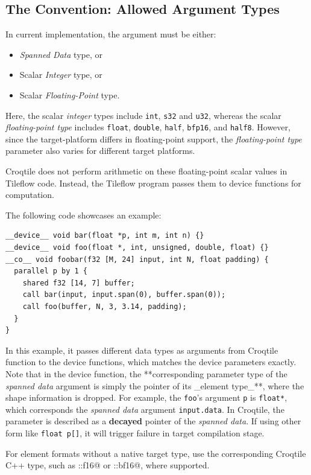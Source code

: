 \subsection*{The Convention: Allowed Argument Types}

In current implementation, the argument must be either:

\begin{itemize}[leftmargin=1.6em]
\item \emph{Spanned Data} type, or
\item Scalar \emph{Integer} type, or
\item Scalar \emph{Floating-Point} type.
\end{itemize}

Here, the scalar \emph{integer} types include \texttt{int}, \texttt{s32} and \texttt{u32}, whereas the scalar \emph{floating-point type} includes \texttt{float}, \texttt{double}, \texttt{half}, \texttt{bfp16}, and \texttt{half8}. However, since the target-platform differs in floating-point support, the \emph{floating-point type} parameter also varies for different target platforms.

Croqtile does not perform arithmetic on these floating-point scalar values in Tileflow code. Instead, the Tileflow program passes them to device functions for computation.

The following code showcases an example:

\begin{lstlisting}[language=croqtile,caption={The Convention: Allowed Argument Types}]
__device__ void bar(float *p, int m, int n) {}
__device__ void foo(float *, int, unsigned, double, float) {}
__co__ void foobar(f32 [M, 24] input, int N, float padding) {
  parallel p by 1 {
    shared f32 [14, 7] buffer;
    call bar(input, input.span(0), buffer.span(0));
    call foo(buffer, N, 3, 3.14, padding);
  }
}
\end{lstlisting}

In this example, it passes different data types as arguments from Croqtile function to the device functions, which matches the device parameters exactly. Note that in the device function, the **corresponding parameter type of the \emph{spanned data} argument is simply the pointer of its \_element type\_**, where the shape information is dropped. For example, the \texttt{foo}'s argument \texttt{p} is \texttt{float*}, which corresponds the \emph{spanned data} argument \texttt{input.data}. In Croqtile, the parameter is described as a \textbf{decayed} pointer of the \emph{spanned data}. If using other form like \texttt{float p[]}, it will trigger failure in target compilation stage.

For element formats without a native target type, use the corresponding Croqtile C++ type, such as \co@croq::f16@ or \co@croq::bf16@, where supported.
